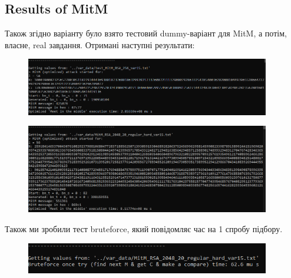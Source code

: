 \subsection{Results of MitM}
Також згідно варіанту було взято тестовий dummy-варіант для MitM, а потім, власне, real завдання. Отримані наступні результати: 

\begin{figure}[!ht]
    \centering
    \begin{minipage}{0.95\linewidth}
        \includegraphics[width=0.95\textwidth, scale=1.5]{ReportPic/report_4_MitM_test.png}
    \end{minipage}
\end{figure}
\begin{figure}[!ht]
    \centering
    \begin{minipage}{0.95\linewidth}
        \includegraphics[width=0.95\textwidth, scale=1.5]{ReportPic/report_5_MitM_hard.png}
    \end{minipage}
\end{figure}

Також ми зробили тест bruteforce, який повідомляє час на 1 спробу підбору.
\begin{figure}[!ht]
    \centering
    \begin{minipage}{0.95\linewidth}
        \includegraphics[width=0.95\textwidth, scale=1.5]{ReportPic/report_6_brutforce_hard.png}
    \end{minipage}
\end{figure}

